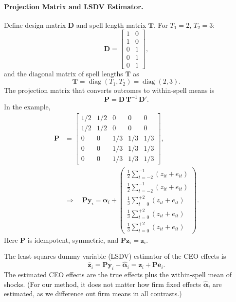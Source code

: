\documentclass[sigconf,nonacm]{acmart}
\begin{document}
\paragraph{Projection Matrix and LSDV Estimator.} Define design matrix $\mathbf D$ and spell-length matrix $\mathbf T$. For $T_1=2$, $T_2=3$:
\[
  \mathbf D = \begin{bmatrix}
    1 & 0\\
    1 & 0\\
    0 & 1\\
    0 & 1\\
    0 & 1
  \end{bmatrix},
\]
and the diagonal matrix of spell lengths $\mathbf T$ as
$$
  \mathbf T = \operatorname{diag}(T_1,T_2)=\operatorname{diag}(2,3).
$$
The projection matrix that converts outcomes to within-spell means is
$$
  \mathbf P = \mathbf D\,\mathbf T^{-1}\,\mathbf D'.
$$
In the example,
\[
\begin{aligned}
\mathbf P &=
\begin{bmatrix}
    1/2 & 1/2 & 0 & 0 & 0\\
    1/2 & 1/2 & 0 & 0 & 0\\
    0 & 0 & 1/3 & 1/3 & 1/3\\
    0 & 0 & 1/3 & 1/3 & 1/3\\
    0 & 0 & 1/3 & 1/3 & 1/3
\end{bmatrix},\\
&\Rightarrow\quad
\mathbf {Py}_i =
\mathbf\alpha_i +
\begin{pmatrix}
  \frac12 \sum_{t=-2}^{-1} (z_{it} + e_{it}) \\
  \frac12 \sum_{t=-2}^{-1} (z_{it} + e_{it}) \\
  \frac13 \sum_{t=0}^{+2} (z_{it} + e_{it})\\
  \frac13 \sum_{t=0}^{+2} (z_{it} + e_{it})\\
  \frac13 \sum_{t=0}^{+2} (z_{it} + e_{it})
\end{pmatrix}.
\end{aligned}
\]
Here $\mathbf P$ is idempotent, symmetric, and $\mathbf P\mathbf z_i = \mathbf z_i$.

The least-squares dummy variable (LSDV) estimator of the CEO effects is
\begin{equation}\label{eq:lsdv_appendix}
  \hat{\mathbf z}_i = \mathbf P\mathbf y_i - \hat{\mathbf \alpha}_i = \mathbf z_i + \mathbf P\mathbf e_i.
\end{equation}  
The estimated CEO effects are the true effects plus the within-spell mean of shocks. (For our method, it does not matter how firm fixed effects $\hat{\mathbf \alpha}_i$ are estimated, as we difference out firm means in all contrasts.)
\end{document}
